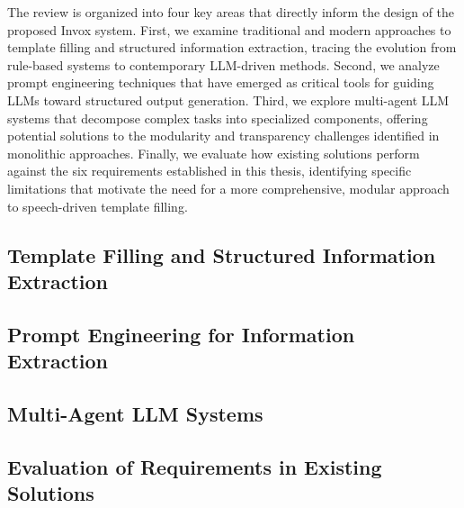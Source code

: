 The review is organized into four key areas that directly inform the design of the proposed Invox system. First, we examine traditional and modern approaches to template filling and structured information extraction, tracing the evolution from rule-based systems to contemporary LLM-driven methods. Second, we analyze prompt engineering techniques that have emerged as critical tools for guiding LLMs toward structured output generation. Third, we explore multi-agent LLM systems that decompose complex tasks into specialized components, offering potential solutions to the modularity and transparency challenges identified in monolithic approaches. Finally, we evaluate how existing solutions perform against the six requirements established in this thesis, identifying specific limitations that motivate the need for a more comprehensive, modular approach to speech-driven template filling.


\subsection{Template Filling and Structured Information Extraction}


\subsection{Prompt Engineering for Information Extraction}


\subsection{Multi-Agent LLM Systems}


\subsection{Evaluation of Requirements in Existing Solutions}

